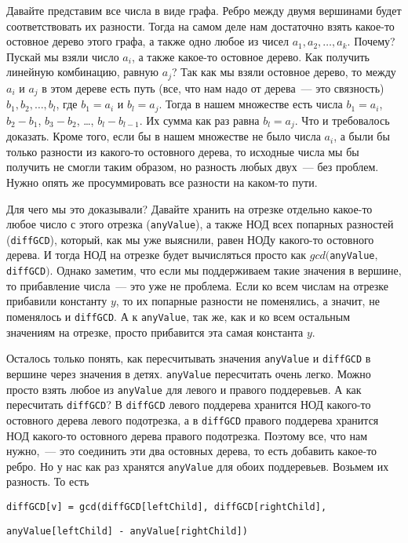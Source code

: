 Давайте представим все числа в виде графа. Ребро между двумя вершинами будет соответствовать их разности. Тогда на самом деле нам достаточно взять какое-то остовное дерево этого графа, а также одно любое из чисел $a_1, a_2, \ldots, a_k$. Почему? Пускай мы взяли число $a_i$, а также какое-то остовное дерево. Как получить линейную комбинацию, равную $a_j$?
Так как мы взяли остовное дерево, то между $a_i$ и $a_j$ в этом дереве есть путь (все, что нам надо от дерева~--- это связность) $b_1, b_2, \ldots, b_l$, где $b_1 = a_i$ и $b_l = a_j$. Тогда в нашем множестве есть числа $b_1 = a_i$, $b_2 - b_1$, $b_3 - b_2$, \ldots, $b_l - b_{l - 1}$. Их сумма как раз равна $b_l = a_j$. Что и требовалось доказать. Кроме того, если бы в нашем множестве не было числа $a_i$, а были бы только разности из какого-то остовного дерева, то исходные числа мы бы получить не смогли таким образом, но разность любых двух~--- без проблем. Нужно опять же просуммировать все разности на каком-то пути.

Для чего мы это доказывали? Давайте хранить на отрезке отдельно какое-то любое число с этого отрезка (\verb+anyValue+), а также НОД всех попарных разностей (\verb+diffGCD+), который, как мы уже выяснили, равен НОДу какого-то остовного дерева. И тогда НОД на отрезке будет вычисляться просто как $gcd($\verb+anyValue+$,$\verb+diffGCD+$)$. Однако заметим, что если мы поддерживаем такие значения в вершине, то прибавление числа~--- это уже не проблема. Если ко всем числам на отрезке прибавили константу $y$, то их попарные разности не поменялись, а значит, не поменялось и \verb+diffGCD+. А к \verb+anyValue+, так же, как и ко всем остальным значениям на отрезке, просто прибавится эта самая константа $y$.

Осталось только понять, как пересчитывать значения \verb+anyValue+ и \verb+diffGCD+ в вершине через значения в детях.
\verb+anyValue+ пересчитать очень легко. Можно просто взять любое из \verb+anyValue+ для левого и правого поддеревьев.
А как пересчитать \verb+diffGCD+? В \verb+diffGCD+ левого поддерева хранится НОД какого-то остовного дерева левого подотрезка, а в \verb+diffGCD+ правого поддерева хранится НОД какого-то остовного дерева правого подотрезка. Поэтому все, что нам нужно,~--- это соединить эти два остовных дерева, то есть добавить какое-то ребро. Но у нас как раз хранятся \verb+anyValue+ для обоих поддеревьев. Возьмем их разность.
То есть

\verb+diffGCD[v] = gcd(diffGCD[leftChild], diffGCD[rightChild],+

\verb+anyValue[leftChild] - anyValue[rightChild])+

